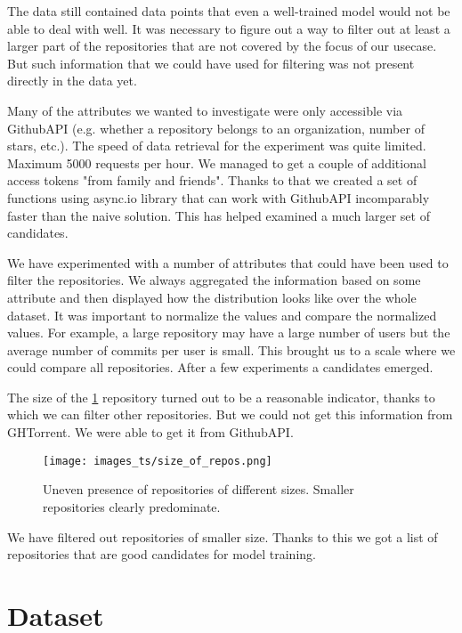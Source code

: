 \documentclass[thesis=M,english]{FITthesis}[2019/12/23]
\begin{document}
The data still contained data points that even a well-trained model would not be able to deal with well. It was necessary to figure out a way to filter out at least a larger part of the repositories that are not covered by the focus of our usecase. But such information that we could have used for filtering was not present directly in the data yet. 

Many of the attributes we wanted to investigate were only accessible via GithubAPI (e.g. whether a repository belongs to an organization, number of stars, etc.).  The speed of data retrieval for the experiment was quite limited. Maximum 5000 requests per hour. We managed to get a couple of additional access tokens "from family and friends". Thanks to that we created a set of functions using async.io library that can work with GithubAPI incomparably faster than the naive solution. This has helped examined a much larger set of candidates.

We have experimented with a number of attributes that could have been used to filter the repositories. We always aggregated the information based on some attribute and then displayed how the distribution looks like over the whole dataset. It was important to normalize the values and compare the normalized values. For example, a large repository may have a large number of users but the average number of commits per user is small. This brought us to a scale where we could compare all repositories. After a few experiments a candidates emerged.

The size of the \ref{fig:size_of_repos} repository turned out to be a reasonable indicator, thanks to which we can filter other repositories. But we could not get this information from GHTorrent. We were able to get it from GithubAPI.

\begin{figure}[ht!]
    \centering
    \texttt{[image: images\_ts/size\_of\_repos.png]}
    \caption{Uneven presence of repositories of different sizes. Smaller repositories clearly predominate.} 
    \label{fig:size_of_repos}
\end{figure}

We have filtered out repositories of smaller size. Thanks to this we got a list of repositories that are good candidates for model training.

\clearpage
\section{Dataset}
\label{label:Dataset}
\end{document}
